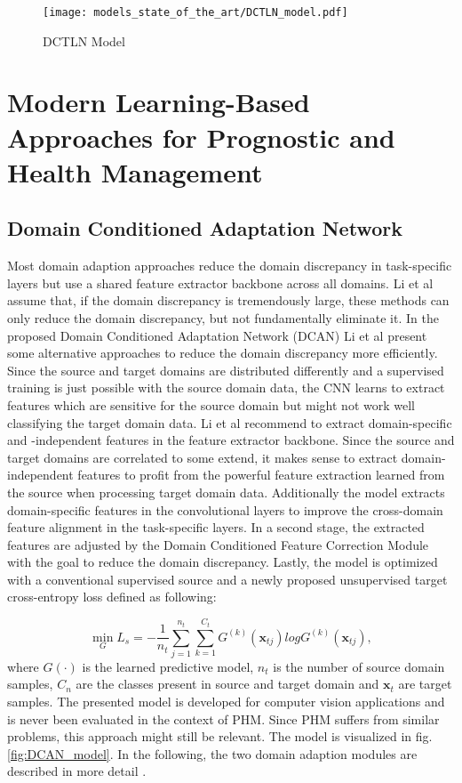 \begin{figure}[H]
  \centering
  \texttt{[image: models\_state\_of\_the\_art/DCTLN\_model.pdf]}
  \caption{DCTLN Model \cite{Guo2019}}
  \label{fig:DCTLN_model}
\end{figure}

\section{Modern Learning-Based Approaches for Prognostic and Health Management }
\subsection{Domain Conditioned Adaptation Network}
Most domain adaption approaches reduce the domain discrepancy in task-specific layers but use a shared feature extractor backbone across all domains. Li et al \cite{li2020} assume that, if the domain discrepancy is tremendously large, these methods can only reduce the domain discrepancy, but not fundamentally eliminate it. In the proposed Domain Conditioned Adaptation Network (DCAN) Li et al present some alternative approaches to reduce the domain discrepancy more efficiently. Since the source and target domains are distributed differently and a supervised training is just possible with the source domain data, the CNN learns to extract features which are sensitive for the source domain but might not work well classifying the target domain data. Li et al recommend to extract domain-specific and -independent features in the feature extractor backbone. Since the source and target domains are correlated to some extend, it makes sense to extract domain-independent features to profit from the powerful feature extraction learned from the source when processing target domain data. Additionally the model extracts domain-specific features in the convolutional layers to improve the cross-domain feature alignment in the task-specific layers. In a second stage, the extracted features are adjusted by the Domain Conditioned Feature Correction Module with the goal to reduce the domain discrepancy. Lastly, the model is optimized with a conventional supervised source and a newly proposed unsupervised target cross-entropy loss defined as following:

\begin{equation}
    \min_{G} L_{s} = -\frac{1}{n_{t}} \sum_{j=1}^{n_{t}} \sum_{k=1}^{C_{t}} G^{(k)}(\pmb{x}_{tj})logG^{(k)}(\pmb{x}_{tj}),
\end{equation}
where $G(\cdot)$ is the learned predictive model, $n_{t}$ is the number of source domain samples, $C_{n}$ are the classes present in source and target domain and $\pmb{x}_{t}$ are target samples. The presented model is developed for computer vision applications and is never been evaluated in the context of PHM. Since PHM suffers from similar problems, this approach might still be relevant. The model is visualized in fig. \ref{fig:DCAN_model}. In the following, the two domain adaption modules are described in more detail \cite{li2020}. 

